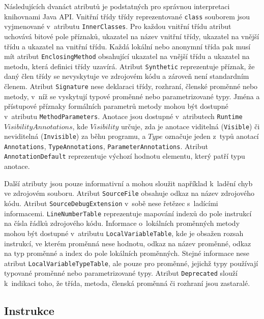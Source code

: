 Následujících dvanáct atributů je podstatných pro správnou interpretaci knihovnami Java API. Vnitřní třídy třídy reprezentované \texttt{class} souborem jsou vyjmenované v~atributu \texttt{InnerClasses}. Pro každou vnitřní třídu atribut uchovává bitové pole příznaků, ukazatel na název vnitřní třídy, ukazatel na vnější třídu a ukazatel na vnitřní třídu. Každá lokální nebo anonymní třída pak musí mít atribut \texttt{EnclosingMethod} obsahující ukazatel na vnější třídu a ukazatel na metodu, která definici třídy uzavírá. Atribut \texttt{Synthetic} reprezentuje příznak, že daný člen třídy se nevyskytuje ve zdrojovém kódu a zároveň není standardním členem. Atribut \texttt{Signature} nese deklaraci třídy, rozhraní, členské proměnné nebo metody, v~níž se vyskytují typové proměnné nebo parametrizované typy. Jména a přístupové příznaky formálních parametrů metody mohou být dostupné v~atributu \texttt{MethodParameters}. 
Anotace jsou dostupné v~atributech \texttt{Runtime}$Visibility$$Annotations$, kde $Visibility$ určuje, zda je anotace viditelná (\texttt{Visible}) či neviditelná (\texttt{Invisible}) za běhu programu, a $Type$ označuje jeden z~typů anotací \texttt{Annotations}, \texttt{TypeAnnotations}, \texttt{ParameterAnnotations}.
Atribut \texttt{AnnotationDefault} reprezentuje výchozí hodnotu elementu, který patří typu anotace.

Další atributy jsou pouze informativní a mohou sloužit například k~ladění chyb ve zdrojovém souboru. Atribut \texttt{SourceFile} obsahuje odkaz na název zdrojového kódu. Atribut \texttt{SourceDebugExtension} v~sobě nese řetězec s~ladícími informacemi. \texttt{LineNumberTable} reprezentuje mapování indexů do pole instrukcí na čísla řádků zdrojového kódu. Informace o~lokálních proměnných metody mohou být dostupné v~atributu \texttt{LocalVariableTable}, kde je obsažen rozsah instrukcí, ve kterém proměnná nese hodnotu, odkaz na název proměnné, odkaz na typ proměnné a index do pole lokálních proměnných. Stejné informace nese atribut \texttt{LocalVariableTypeTable}, ale pouze pro proměnné, jejichž typy používají typované proměnné nebo parametrizované typy. Atribut \texttt{Deprecated} slouží k~indikaci toho, že třída, metoda, členská proměnná či rozhraní jsou zastaralé.

\subsection{Instrukce}\label{FormatInstruction}

